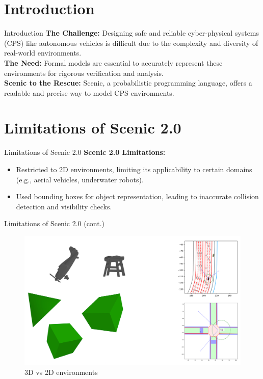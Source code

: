 \documentclass[10pt]{beamer}
\begin{document}
\section[Intro]{Introduction}

\begin{frame}{Introduction}
    \textbf{The Challenge:} Designing safe and reliable cyber-physical systems (CPS) like autonomous vehicles is difficult due to the complexity and diversity of real-world environments.\\
    \textbf{The Need:} Formal models are essential to accurately represent these environments for rigorous verification and analysis.\\
    \textbf{Scenic to the Rescue:} Scenic, a probabilistic programming language, offers a readable and precise way to model CPS environments.
\end{frame}



\section{Limitations of Scenic 2.0}

\begin{frame}{Limitations of Scenic 2.0}  
    \textbf{Scenic 2.0 Limitations:}\\
    \begin{itemize}
        \item Restricted to 2D environments, limiting its applicability to certain domains (e.g., aerial vehicles, underwater robots).
        \item Used bounding boxes for object representation, leading to inaccurate collision detection and visibility checks.
    \end{itemize}
\end{frame}

\begin{frame}{Limitations of Scenic 2.0 (cont.)}  
    \begin{figure}
        \centering
        \includegraphics[width=1\linewidth]{2D_vs_3D.png}
        \caption{3D vs 2D environments}
        \label{fig:2d-vs-3d}
    \end{figure}
\end{frame}
\end{document}
